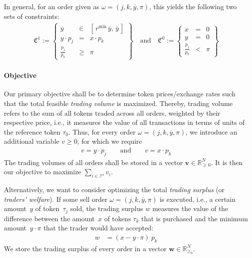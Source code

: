 \documentclass[11pt,parskip=full]{scrartcl}%
\newcommand*{\ie}{i.e., }
\newcommand*{\Min}{\mathrm{min}}
\newcommand*{\iorders}{\mathcal{I}^o}       %
\begin{document}
In general, for an order given as $ \omega = (j,k,\overline{y},\pi) $, this yields
the following two sets of constraints:
\begin{align}
  \mathfrak{C}^1 := \left\{
  \begin{array}{rll}
    y &\in & [\, r^\Min \, \overline{y}, \, \overline{y}\,] \\
    y \cdot p_j &= & x \cdot p_k \\[1mm]
    \frac{p_j}{p_k} &\ge & \pi
  \end{array}
  \right\}
  \quad
  \text{and}
  \quad
  \mathfrak{C}^0 := \left\{
  \begin{array}{rll}
    x &= & 0 \\
    y &= & 0 \\[1mm]
    \frac{p_j}{p_k} &< & \pi
  \end{array}
  \right\}
  \label{eq:order_model_generic}
\end{align}

\paragraph{Objective}

Our primary objective shall be to determine token prices/exchange rates such that the total
feasible \emph{trading volume} is maximized.
Thereby, trading volume refers to the sum of all tokens traded across all orders, weighted by their
respective price, \ie it measures the value of all transactions in terms of units of the reference
token $ \tau_0 $.
Thus, for every order $ \omega = (j,k,\overline{y},\pi) $, we introduce an additional
variable $ v \ge 0 $, for which we require
\begin{align}
  v = y \cdot p_j \qquad \text{and} \qquad v = x \cdot p_k
  \label{eq:trading_volume}
\end{align}
The trading volumes of all orders shall be stored in a vector
$ \mathbf{v} \in \mathbb{R}^N_{\ge 0} $.
It is then our objective to maximize $ \sum_{i \in \iorders} v_i $.

Alternatively, we want to consider optimizing the total \emph{trading surplus}
(or \emph{traders' welfare}).
If some sell order $ \omega = (j,k,\overline{y},\pi) $ is executed, \ie a certain amount~$ y $
of token~$ \tau_j $ sold, the trading surplus $ w $ measures the value of the difference between
the amount~$ x $ of tokens $ \tau_k $ that is purchased and the minimum amount~$ y \cdot \pi $ that
the trader would have accepted:
\begin{align}
  w &= ( x - y \cdot \pi ) \> p_k%
  \label{eq:trading_surplus}
\end{align}
We store the trading surplus of every order in a vector
$ \mathbf{w} \in \mathbb{R}^N_{\ge_0} $.
\end{document}
